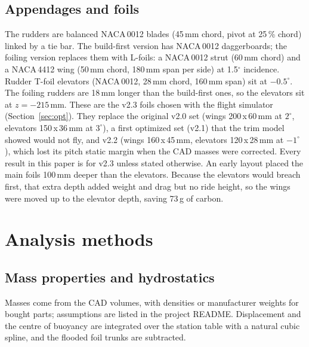 \documentclass[10pt,twocolumn]{article}
\begin{document}
\subsection{Appendages and foils}
The rudders are balanced NACA\,0012 blades (45\,mm chord, pivot at 25\,\% chord) linked by a tie bar. The build-first version has NACA\,0012 daggerboards; the foiling version replaces them with L-foils: a NACA\,0012 strut (60\,mm chord) and a NACA\,4412 wing (50\,mm chord, 180\,mm span per side) at 1.5$^\circ$ incidence. Rudder T-foil elevators (NACA\,0012, 28\,mm chord, 160\,mm span) sit at $-0.5^\circ$. The foiling rudders are 18\,mm longer than the build-first ones, so the elevators sit at $z=-215$\,mm. These are the v2.3 foils chosen with the flight simulator (Section~\ref{sec:opt}). They replace the original v2.0 set (wings 200\,x\,60\,mm at $2^\circ$, elevators 150\,x\,36\,mm at $3^\circ$), a first optimized set (v2.1) that the trim model showed would not fly, and v2.2 (wings 160\,x\,45\,mm, elevators 120\,x\,28\,mm at $-1^\circ$), which lost its pitch static margin when the CAD masses were corrected. Every result in this paper is for v2.3 unless stated otherwise. An early layout placed the main foils 100\,mm deeper than the elevators. Because the elevators would breach first, that extra depth added weight and drag but no ride height, so the wings were moved up to the elevator depth, saving 73\,g of carbon.

\section{Analysis methods}
\subsection{Mass properties and hydrostatics}
Masses come from the CAD volumes, with densities or manufacturer weights for bought parts; assumptions are listed in the project README. Displacement and the centre of buoyancy are integrated over the station table with a natural cubic spline, and the flooded foil trunks are subtracted.
\end{document}

